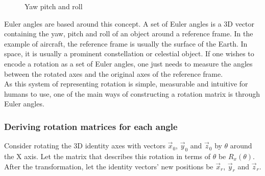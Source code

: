 \documentclass[12pt, a4paper]{article}
\begin{document}
\begin{figure}[H]
    \centering
    \caption{Yaw pitch and roll}
    \label{yawpitchroll}
\end{figure}

Euler angles are based around this concept. A set of Euler angles is a 3D vector
containing the yaw, pitch and roll of an object around a reference frame. In the
example of aircraft, the reference frame is usually the surface of the Earth. In
space, it is usually a prominent constellation or celestial object. If one
wishes to encode a rotation as a set of Euler angles, one just needs to measure
the angles between the rotated axes and the original axes of the reference
frame. \\

As this system of representing rotation is simple, measurable and intuitive for
humans to use, one of the main ways of constructing a rotation matrix is through
Euler angles.

\pagebreak
\subsubsection{Deriving rotation matrices for each angle}
\label{section_deriving_rot_for_each_angle}
Consider rotating the 3D identity axes with vectors $\vec{x}_0$, $\vec{y}_0$ and
$\vec{z}_0$ by $\theta$ around the X axis. Let the matrix that describes this
rotation in terms of $\theta$ be $R_x(\theta)$. After the transformation, let
the identity vectors' new positions be $\vec{x}_r$, $\vec{y}_r$ and $\vec{z}_r$.
\\
\end{document}
